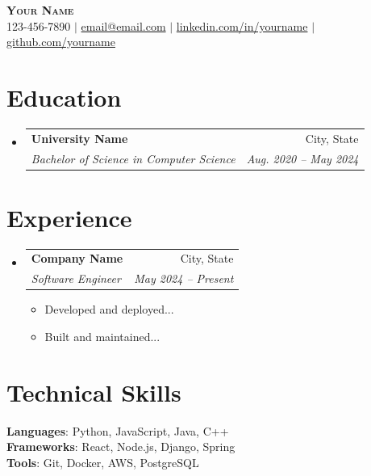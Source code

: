 \documentclass[letterpaper,11pt]{article}
\makeatletter
\newcommand{\resumeItem}[1]{\item\small{#1 \vspace{-2pt}}}
\newcommand{\resumeSubheading}[4]{\vspace{-2pt}\item\begin{tabular*}{0.97\textwidth}[t]{l@{\extracolsep{\fill}}r}\textbf{#1} & #2 \\\textit{\small#3} & \textit{\small #4} \\\end{tabular*}\vspace{-7pt}}
\newcommand{\resumeSubHeadingListStart}{\begin{itemize}[leftmargin=0.15in, label={}]}
\newcommand{\resumeSubHeadingListEnd}{\end{itemize}}
\newcommand{\resumeItemListStart}{\begin{itemize}}
\newcommand{\resumeItemListEnd}{\end{itemize}\vspace{-5pt}}
\makeatother
\begin{document}
\begin{center}
    \textbf{\Huge \scshape Your Name} \\ \vspace{1pt}
    \small 123-456-7890 $|$ \href{mailto:email@email.com}{email@email.com} $|$
    \href{https://linkedin.com/in/yourname}{linkedin.com/in/yourname} $|$
    \href{https://github.com/yourname}{github.com/yourname}
\end{center}

\section{Education}
  \resumeSubHeadingListStart
    \resumeSubheading
      {University Name}{City, State}
      {Bachelor of Science in Computer Science}{Aug. 2020 -- May 2024}
  \resumeSubHeadingListEnd

\section{Experience}
  \resumeSubHeadingListStart
    \resumeSubheading
      {Company Name}{City, State}
      {Software Engineer}{May 2024 -- Present}
      \resumeItemListStart
        \resumeItem{Developed and deployed...}
        \resumeItem{Built and maintained...}
      \resumeItemListEnd
  \resumeSubHeadingListEnd

\section{Technical Skills}
 \begin{itemize}[leftmargin=0.15in, label={}]
    \small{\item{
     \textbf{Languages}{: Python, JavaScript, Java, C++} \\
     \textbf{Frameworks}{: React, Node.js, Django, Spring} \\
     \textbf{Tools}{: Git, Docker, AWS, PostgreSQL}
    }}
 \end{itemize}
\end{document}
